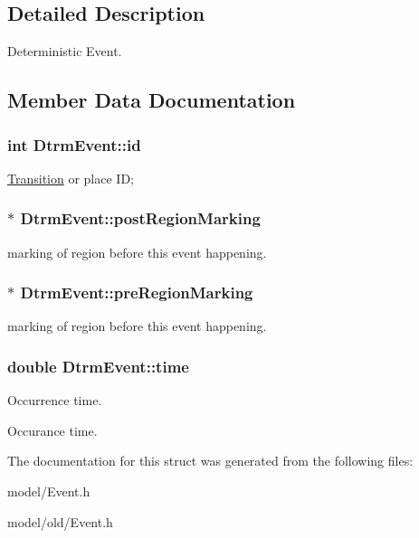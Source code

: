 \subsection{Detailed Description}
Deterministic Event. 

\subsection{Member Data Documentation}
\hypertarget{structDtrmEvent_ab5e19522a82d496b8a66791bce168d81}{
\subsubsection[{id}]{\setlength{\rightskip}{0pt plus 5cm}int Dtrm\-Event\-::id}}\label{structDtrmEvent_ab5e19522a82d496b8a66791bce168d81}
\hyperlink{structTransition}{Transition} or place I\-D; \hypertarget{structDtrmEvent_adb35b6b002efbadbb2c01c36ff9bffb0}{
\subsubsection[{post\-Region\-Marking}]{ $\ast$ Dtrm\-Event\-::post\-Region\-Marking}}\label{structDtrmEvent_adb35b6b002efbadbb2c01c36ff9bffb0}
marking of region before this event happening. \hypertarget{structDtrmEvent_acaa9ee345f104aee09a01fe0594eab70}{
\subsubsection[{pre\-Region\-Marking}]{ $\ast$ Dtrm\-Event\-::pre\-Region\-Marking}}\label{structDtrmEvent_acaa9ee345f104aee09a01fe0594eab70}
marking of region before this event happening. \hypertarget{structDtrmEvent_a23d94e3ab2a80c673f5e42aac1b6ecb0}{
\subsubsection[{time}]{\setlength{\rightskip}{0pt plus 5cm}double Dtrm\-Event\-::time}}\label{structDtrmEvent_a23d94e3ab2a80c673f5e42aac1b6ecb0}
Occurrence time.

Occurance time. 

The documentation for this struct was generated from the following files\-:\begin{DoxyCompactItemize}
\item 
model/Event.\-h\item 
model/old/Event.\-h\end{DoxyCompactItemize}
